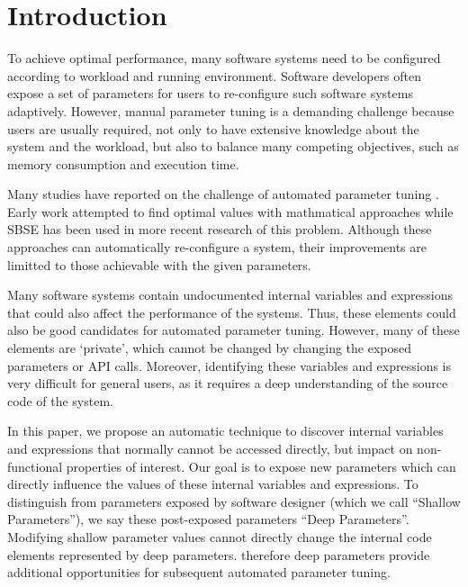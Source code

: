 
\section{Introduction}

To achieve optimal performance, many software systems need to be configured according to workload and running environment. 
Software developers often expose a set of parameters for users to re-configure such software systems adaptively.
However, manual parameter tuning is a demanding challenge because users are usually required, not only to have extensive knowledge about the system and the workload, but also to balance many competing objectives, such as memory consumption and execution time.

Many studies have reported on the challenge of automated parameter tuning \cite{Hoffmann:2011:DKR:1961296.1950390, Vuduc01statisticalmodels,autotuning,Whaley:1998:ATL:509058.509096,Tapus:2002:AHT:762761.762771, hutter2009paramils,arcuri-ssbse-2011,Hoffmann:2011:DKR:1961296.1950390}. Early work attempted to find optimal values with mathmatical approaches \cite{Vuduc01statisticalmodels,autotuning,Whaley:1998:ATL:509058.509096,Tapus:2002:AHT:762761.762771} while SBSE \cite{Harman:2007:CSF:1253532.1254729} has been used in more recent research \cite{hutter2009paramils,arcuri-ssbse-2011,Hoffmann:2011:DKR:1961296.1950390} of this problem. Although these approaches can automatically re-configure a system, their improvements are limitted to those achievable with the given parameters.


Many software systems contain undocumented internal variables and expressions that could also affect the performance of the systems. Thus, these elements could also be good candidates for automated parameter tuning. However, many of these elements are `private', which cannot be changed by changing the exposed parameters or API calls. Moreover, identifying these variables and expressions is very difficult for general users, as it requires a deep understanding of the source code of the system. 


In this paper, we propose an automatic technique to discover internal variables and expressions that normally cannot be accessed directly, but impact on non-functional properties of interest. Our goal is to expose new parameters which can directly influence the values of these internal variables and expressions. To distinguish from parameters exposed by software designer (which we call ``Shallow Parameters''), we say these post-exposed parameters ``Deep Parameters''. Modifying shallow parameter values cannot directly change the internal code elements represented by deep parameters. therefore deep parameters provide additional opportunities for subsequent automated parameter tuning.


